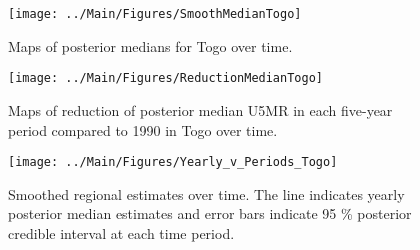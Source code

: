 \documentclass[12pt]{article}\usepackage[]{graphicx}\usepackage[]{color}
\newenvironment{knitrout}{}{} %
\begin{document}
\begin{knitrout}
\color{fgcolor}\begin{figure}[bht]

{\centering \texttt{[image: ../Main/Figures/SmoothMedianTogo]} 

}

\caption[Maps of posterior medians for Togo  over time]{Maps of posterior medians for Togo  over time.}\label{fig:unnamed-chunk-314}
\end{figure}


\end{knitrout}
\begin{knitrout}
\color{fgcolor}\begin{figure}[bht]

{\centering \texttt{[image: ../Main/Figures/ReductionMedianTogo]} 

}

\caption[Maps of reduction of posterior median U5MR in each five-year period compared to 1990 in Togo over time]{Maps of reduction of posterior median U5MR in each five-year period compared to 1990 in Togo over time.}\label{fig:unnamed-chunk-315}
\end{figure}


\end{knitrout}
\begin{knitrout}
\color{fgcolor}\begin{figure}[bht]

{\centering \texttt{[image: ../Main/Figures/Yearly\_v\_Periods\_Togo]} 

}

\caption[Smoothed regional estimates over time]{Smoothed regional estimates over time. The line indicates yearly posterior median estimates and error bars indicate 95 \% posterior credible interval at each time period.}\label{fig:unnamed-chunk-316}
\end{figure}


\end{knitrout}
\end{document}
